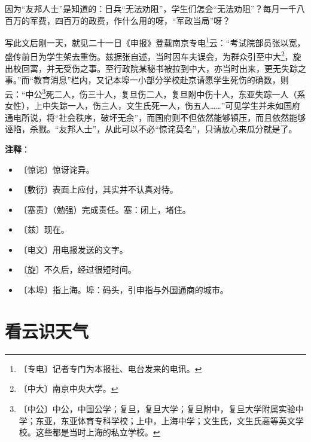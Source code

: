 \documentclass[12pt,UTF-8,openany]{ctexbook}
\begin{document}
\begin{normalsize}
    因为“友邦人士”是知道的：日兵“无法劝阻”，学生们怎会“无法劝阻”？每月一千八百万的军费，四百万的政费，作什么用的呀，“军政当局”呀？
    
    写此文后刚一天，就见二十一日《申报》登载南京专电\footnote{〔专电〕记者专门为本报社、电台发来的电讯。}云：“考试院部员张以宽，盛传前日为学生架去重伤。兹据张自述，当时因车夫误会，为群众引至中大\footnote{〔中大〕南京中央大学。}，旋出校回寓，并无受伤之事。至行政院某秘书被拉到中大，亦当时出来，更无失踪之事。”而“教育消息”栏内，又记本埠一小部分学校赴京请愿学生死伤的确数，则云：“中公\footnote{〔中公〕中公，中国公学；复旦，复旦大学；复旦附中，复旦大学附属实验中学；东亚，东亚体育专科学校；上中，上海中学；文生氏，文生氏高等英文学校。这些都是当时上海的私立学校。}死二人，伤三十人，复旦伤二人，复旦附中伤十人，东亚失踪一人（系女性），上中失踪一人，伤三人，文生氏死一人，伤五人……”可见学生并未如国府通电所说，将“社会秩序，破坏无余”，而国府则不但依然能够镇压，而且依然能够诬陷，杀戮。“友邦人士”，从此可以不必“惊诧莫名”，只请放心来瓜分就是了。
    
\end{normalsize}


\newpage

\textbf{注释}：

\vspace{-1em}

\begin{itemize}
    \setlength\itemsep{-0.2em}
    \item 〔惊诧〕惊讶诧异。
    \item 〔敷衍〕表面上应付，其实并不认真对待。
    \item 〔塞责〕（勉强）完成责任。塞：闭上，堵住。
    \item 〔兹〕现在。
    \item 〔电文〕用电报发送的文字。
    \item 〔旋〕不久后，经过很短时间。
    \item 〔本埠〕指上海。埠：码头，引申指与外国通商的城市。
\end{itemize}

\chapter{看云识天气}
\end{document}
